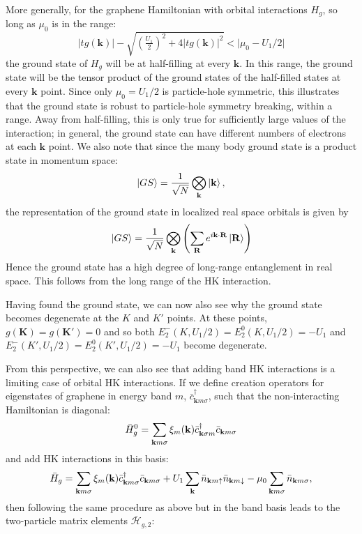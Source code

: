 \documentclass[prb,aps,amssymb,twocolumn,notitlepage]{revtex4-2}
\begin{document}
More generally, for the graphene Hamiltonian with orbital interactions $H_{g}$, so long as $\mu_0$ is in the range:
\begin{equation}
|tg(\mathbf{k})|-\sqrt{(\tfrac{U_1}{2})^2+4|tg(\mathbf{k})|^2}<\big|\mu_0-U_1/2\big|
\end{equation}
the ground state of $H_{g}$ will be at half-filling at every $\mathbf{k}$. 
In this range, the ground state will be the tensor product of the ground states of the half-filled states at every $\mathbf{k}$ point. Since only $\mu_0=U_1/2$ is particle-hole symmetric, this illustrates that the ground state is robust to particle-hole symmetry breaking, within a range.
Away from half-filling, this is only true for sufficiently large values of the interaction; in general, the ground state can have different numbers of electrons at each $\mathbf{k}$ point.  
We also note that since the many body ground state is a product state in momentum space:
\begin{equation}
    \ket{GS}=\frac{1}{\sqrt{N}}\bigotimes_{\mathbf{k}}\ket{\mathbf{k}},
\end{equation}
the representation of the ground state in localized real space orbitals is given by
\begin{equation}
\ket{GS}=\frac{1}{\sqrt{N}}\bigotimes_{\mathbf{k}}\left(\sum_{\mathbf{R}}e^{i\mathbf{k}\cdot\mathbf{R}}\ket{\mathbf{R}}\right)
\end{equation}
Hence the ground state has a high degree of long-range entanglement in real space. This follows from the long range of the HK interaction.

Having found the ground state, we can now also see why the ground state becomes degenerate at the $K$ and $K'$ points. 
At these points, $g(\mathbf{K})=g(\mathbf{K'})=0$ and so both $E^{-}_2(K,U_1/2)=E^{0}_2(K,U_1/2)=-U_1$ and $E^{-}_2(K',U_1/2)=E^{0}_2(K',U_1/2)=-U_1$ become degenerate.

From this perspective, we can also see that adding band HK interactions is a limiting case of orbital HK interactions. 
If we define creation operators for eigenstates of graphene in energy band $m$, $\bar{c}^\dagger_{\mathbf{k}m\sigma}$, such that the non-interacting Hamiltonian is diagonal:
\begin{equation}
\Bar{H}^{0}_g=\sum_{\mathbf{k}m\sigma}\xi_{m}(\mathbf{k})\Bar{c}^\dagger_{\mathbf{k}\sigma m}\Bar{c}_{\mathbf{k}m\sigma}
\end{equation}
and add HK interactions in this basis:
\begin{equation}
\label{eq:bandgrapheneH}
\Bar{H}_{g}=\sum_{\mathbf{k}m\sigma}\xi_m(\mathbf{k})\Bar{c}^\dagger_{\mathbf{k}m\sigma}\Bar{c}_{\mathbf{k}m\sigma}+U_1\sum_{\mathbf{k}}\Bar{n}_{\mathbf{k}m\uparrow}\Bar{n}_{\mathbf{k}m\downarrow}-\mu_{0}\sum_{\mathbf{k}m\sigma}\Bar{n}_{\mathbf{k}m\sigma},
\end{equation}
then following the same procedure as above but in the band basis leads to the two-particle matrix elements $\bar{\mathcal{H}}_{g,2}$:
\end{document}
